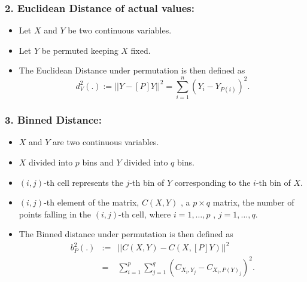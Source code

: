 \documentclass{beamer}
\begin{document}
\begin{frame}
\frametitle{2. Euclidean Distance of actual values:}
\begin{itemize}
\item Let $X$ and $Y$ be two continuous variables.
\item Let $Y$ be permuted keeping $X$ fixed. 
\item The Euclidean Distance under permutation is then defined as 
\[
d^2_V(.) := || Y - [P]Y||^2 = \sum_{i=1}^n (Y_i - Y_{P(i)})^2.
\]
\end{itemize}
\end{frame}

\begin{frame}
\frametitle{3. Binned Distance:}
\begin{itemize}
\item $X$ and $Y$ are two continuous variables. 
\item $X$ divided into $p$ bins and $Y$ divided into $q$ bins. 
\item $(i,j)$-th cell represents the $j$-th bin of $Y$ corresponding to the $i$-th bin of $X$. 
\item $(i,j)$-th element of the matrix, $C(X,Y)$ , a $p \times q$ matrix, the number of points falling in the $(i,j)$-th cell, where $i = 1, \dots, p$ , $j = 1, \dots, q$.
\item The Binned distance under permutation is then defined as
\begin{eqnarray*}
b^2_P(.) &:=& ||C(X,Y) - C(X,[P]Y)||^2 \\ &=& \sum_{i=1}^p \sum_{j=1}^q (C_{X_i,Y_j} - C_{X_i,P(Y)_j})^2.
\end{eqnarray*}
\end{itemize}

\end{frame}
\end{document}
